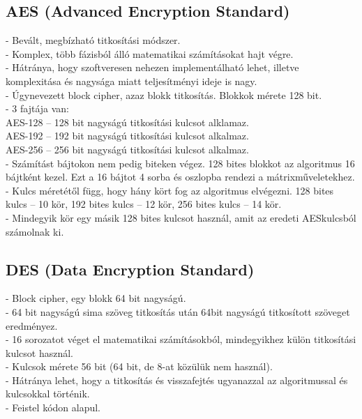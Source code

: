 \subsection{AES (Advanced Encryption Standard)}
\noindent - Bevált, megbízható titkosítási módszer. 
\vspace{5pt}\\- Komplex, több fázisból álló matematikai számításokat hajt végre.
\vspace{5pt}\\- Hátránya, hogy szoftveresen nehezen implementálható lehet, illetve komplexitása és nagysága miatt teljesítményi ideje is nagy.
\vspace{5pt}\\- Úgynevezett block cipher, azaz blokk titkosítás. Blokkok mérete 128 bit.
\vspace{5pt}\\- 3 fajtája van:
\\AES-128 – 128 bit nagyságú titkosítási kulcsot alklamaz.
\\AES-192 – 192 bit nagyságú titkosítási kulcsot alkalmaz.
\\AES-256 – 256 bit nagyságú titkosítási kulcsot alkalmaz.
\vspace{5pt}\\- Számítást bájtokon nem pedig biteken végez. 128 bites blokkot az algoritmus 16 bájtként kezel. Ezt a 16 bájtot 4 sorba és oszlopba rendezi a mátrixműveletekhez.
\vspace{5pt}\\- Kulcs méretétől függ, hogy hány kört fog az algoritmus elvégezni. 128 bites kulcs – 10 kör, 192 bites kulcs – 12 kör, 256 bites kulcs – 14 kör.
\vspace{5pt}\\- Mindegyik kör egy másik 128 bites kulcsot használ, amit az eredeti AESkulcsból számolnak ki.



\subsection{DES (Data Encryption Standard)}
\noindent - Block cipher, egy blokk 64 bit nagyságú.
\vspace{5pt}\\- 64 bit nagyságú sima szöveg titkosítás után 64bit nagyságú titkosított szöveget eredményez.
\vspace{5pt}\\- 16 sorozatot véget el matematikai számításokból, mindegyikhez külön titkosítási kulcsot használ.
\vspace{5pt}\\- Kulcsok mérete 56 bit (64 bit, de 8-at közülük nem használ).
\vspace{5pt}\\- Hátránya lehet, hogy a titkosítás és visszafejtés ugyanazzal az algoritmussal és kulcsokkal történik.
\vspace{5pt}\\- Feistel kódon alapul.



